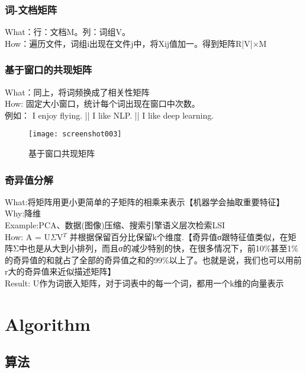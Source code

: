 \documentclass[
10pt, %
a4paper, %
oneside, %
headinclude,footinclude, %
BCOR5mm, %
]{scrartcl}
\begin{document}
\subsubsection{\color{blue}词-文档矩阵}
What：行：文档M。列：词组V。
\\How：遍历文件，词组i出现在文件j中，将Xij值加一。得到矩阵R|V|×M
\subsubsection{\color{blue}基于窗口的共现矩阵}
What：同上，将词频换成了相关性矩阵
\\How: 固定大小窗口，统计每个词出现在窗口中次数。
\\\indent 例如： I enjoy flying. || I like NLP. || I like deep learning. 
\begin{figure}[!htb]
	\centering
	\texttt{[image: screenshot003]}
	\caption{基于窗口共现矩阵}
	\label{fig:screenshot003}
\end{figure}
\subsubsection{\color{blue}奇异值分解}
What:将矩阵用更小更简单的子矩阵的相乘来表示【机器学会抽取重要特征】
\\Why:降维
\\Example:PCA、数据(图像)压缩、搜索引擎语义层次检索LSI
\\How: A = U$\Sigma$V$^T$ 并根据保留百分比保留k个维度.\indent【奇异值σ跟特征值类似，在矩阵Σ中也是从大到小排列，而且σ的减少特别的快，在很多情况下，前10\%甚至1\%的奇异值的和就占了全部的奇异值之和的99\%以上了。也就是说，我们也可以用前r大的奇异值来近似描述矩阵】
\\Result: U作为词嵌入矩阵，对于词表中的每一个词，都用一个k维的向量表示
\newpage 
\section{Algorithm}



\subsection{算法}
\newpage 
\end{document}
